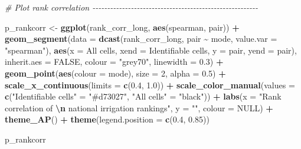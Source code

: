 \documentclass[
  11pt,
]{article}
\newenvironment{Shaded}{\begin{snugshade}}{\end{snugshade}}
\newcommand{\AttributeTok}[1]{\textcolor[rgb]{0.13,0.29,0.53}{#1}}
\newcommand{\CommentTok}[1]{\textcolor[rgb]{0.56,0.35,0.01}{\textit{#1}}}
\newcommand{\ConstantTok}[1]{\textcolor[rgb]{0.56,0.35,0.01}{#1}}
\newcommand{\DecValTok}[1]{\textcolor[rgb]{0.00,0.00,0.81}{#1}}
\newcommand{\FloatTok}[1]{\textcolor[rgb]{0.00,0.00,0.81}{#1}}
\newcommand{\FunctionTok}[1]{\textcolor[rgb]{0.13,0.29,0.53}{\textbf{#1}}}
\newcommand{\NormalTok}[1]{#1}
\newcommand{\OtherTok}[1]{\textcolor[rgb]{0.56,0.35,0.01}{#1}}
\newcommand{\SpecialCharTok}[1]{\textcolor[rgb]{0.81,0.36,0.00}{\textbf{#1}}}
\newcommand{\StringTok}[1]{\textcolor[rgb]{0.31,0.60,0.02}{#1}}
\begin{document}
\begin{Shaded}
\begin{Highlighting}[]
\CommentTok{\# Plot rank correlation {-}{-}{-}{-}{-}{-}{-}{-}{-}{-}{-}{-}{-}{-}{-}{-}{-}{-}{-}{-}{-}{-}{-}{-}{-}{-}{-}{-}{-}{-}{-}{-}{-}{-}{-}{-}{-}{-}{-}{-}{-}{-}{-}{-}{-}{-}{-}{-}{-}{-}{-}{-}{-}{-}{-}{-}}

\NormalTok{p\_rankcorr }\OtherTok{\textless{}{-}} \FunctionTok{ggplot}\NormalTok{(rank\_corr\_long, }\FunctionTok{aes}\NormalTok{(spearman, pair)) }\SpecialCharTok{+}
  \FunctionTok{geom\_segment}\NormalTok{(}\AttributeTok{data =} \FunctionTok{dcast}\NormalTok{(rank\_corr\_long, pair }\SpecialCharTok{\textasciitilde{}}\NormalTok{ mode, }\AttributeTok{value.var =} \StringTok{"spearman"}\NormalTok{),}
               \FunctionTok{aes}\NormalTok{(}\AttributeTok{x =} \StringTok{\textasciigrave{}}\AttributeTok{All cells}\StringTok{\textasciigrave{}}\NormalTok{, }\AttributeTok{xend =} \StringTok{\textasciigrave{}}\AttributeTok{Identifiable cells}\StringTok{\textasciigrave{}}\NormalTok{,}
                   \AttributeTok{y =}\NormalTok{ pair, }\AttributeTok{yend =}\NormalTok{ pair),}
               \AttributeTok{inherit.aes =} \ConstantTok{FALSE}\NormalTok{,}
               \AttributeTok{colour =} \StringTok{"grey70"}\NormalTok{, }\AttributeTok{linewidth =} \FloatTok{0.3}\NormalTok{) }\SpecialCharTok{+}
  \FunctionTok{geom\_point}\NormalTok{(}\FunctionTok{aes}\NormalTok{(}\AttributeTok{colour =}\NormalTok{ mode), }\AttributeTok{size =} \DecValTok{2}\NormalTok{, }\AttributeTok{alpha =} \FloatTok{0.5}\NormalTok{) }\SpecialCharTok{+}
  \FunctionTok{scale\_x\_continuous}\NormalTok{(}\AttributeTok{limits =} \FunctionTok{c}\NormalTok{(}\FloatTok{0.4}\NormalTok{, }\FloatTok{1.0}\NormalTok{)) }\SpecialCharTok{+}
  \FunctionTok{scale\_color\_manual}\NormalTok{(}\AttributeTok{values =} \FunctionTok{c}\NormalTok{(}\StringTok{"Identifiable cells"} \OtherTok{=} \StringTok{"\#d73027"}\NormalTok{,}
                                \StringTok{"All cells"} \OtherTok{=} \StringTok{"black"}\NormalTok{)) }\SpecialCharTok{+}
  \FunctionTok{labs}\NormalTok{(}\AttributeTok{x =} \StringTok{"Rank correlation of }\SpecialCharTok{\textbackslash{}n}\StringTok{ national irrigation rankings"}\NormalTok{,}
       \AttributeTok{y =} \StringTok{""}\NormalTok{,}
       \AttributeTok{colour =} \ConstantTok{NULL}\NormalTok{) }\SpecialCharTok{+}
  \FunctionTok{theme\_AP}\NormalTok{() }\SpecialCharTok{+}
  \FunctionTok{theme}\NormalTok{(}\AttributeTok{legend.position =} \FunctionTok{c}\NormalTok{(}\FloatTok{0.4}\NormalTok{, }\FloatTok{0.85}\NormalTok{))}

\NormalTok{p\_rankcorr}
\end{Highlighting}
\end{Shaded}
\end{document}

